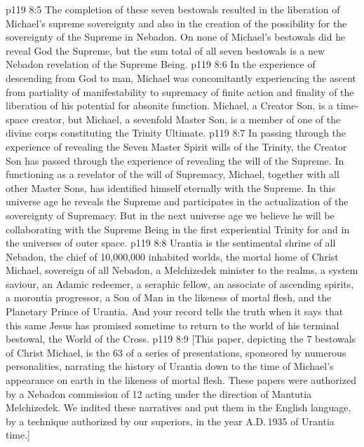 \vs p119 8:5 The completion of these seven bestowals resulted in the liberation of Michael’s supreme sovereignty and also in the creation of the possibility for the sovereignty of the Supreme in Nebadon. On none of Michael’s bestowals did he reveal God the Supreme, but the sum total of all seven bestowals is a new Nebadon revelation of the Supreme Being.
\vs p119 8:6 In the experience of descending from God to man, Michael was concomitantly experiencing the ascent from partiality of manifestability to supremacy of finite action and finality of the liberation of his potential for absonite function. Michael, a Creator Son, is a time\hyp{}space creator, but Michael, a sevenfold Master Son, is a member of one of the divine corps constituting the Trinity Ultimate.
\vs p119 8:7 In passing through the experience of revealing the Seven Master Spirit wills of the Trinity, the Creator Son has passed through the experience of revealing the will of the Supreme. In functioning as a revelator of the will of Supremacy, Michael, together with all other Master Sons, has identified himself eternally with the Supreme. In this universe age he reveals the Supreme and participates in the actualization of the sovereignty of Supremacy. But in the next universe age we believe he will be collaborating with the Supreme Being in the first experiential Trinity for and in the universes of outer space.
\vs p119 8:8 \pc Urantia is the sentimental shrine of all Nebadon, the chief of 10,000,000 inhabited worlds, the mortal home of Christ Michael, sovereign of all Nebadon, a Melchizedek minister to the realms, a system saviour, an Adamic redeemer, a seraphic fellow, an associate of ascending spirits, a morontia progressor, a Son of Man in the likeness of mortal flesh, and the Planetary Prince of Urantia. And your record tells the truth when it says that this same Jesus has promised sometime to return to the world of his terminal bestowal, the World of the Cross.
\vsetoff
\vs p119 8:9 [This paper, depicting the 7 bestowals of Christ Michael, is the 63 of a series of presentations, sponsored by numerous personalities, narrating the history of Urantia down to the time of Michael’s appearance on earth in the likeness of mortal flesh. These papers were authorized by a Nebadon commission of 12 acting under the direction of Mantutia Melchizedek. We indited these narratives and put them in the English language, by a technique authorized by our superiors, in the year A.D.\,1935 of Urantia time.]
\quizlink
